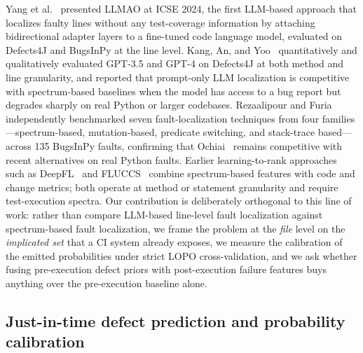 \documentclass[preprint,12pt]{elsarticle}
\begin{document}
Yang et al.~\cite{yang2024llmao} presented LLMAO at ICSE 2024, the first LLM-based approach that localizes faulty lines without any test-coverage information by attaching bidirectional adapter layers to a fine-tuned code language model, evaluated on Defects4J and BugsInPy at the line level. Kang, An, and Yoo~\cite{kang2024llmfl} quantitatively and qualitatively evaluated GPT-3.5 and GPT-4 on Defects4J at both method and line granularity, and reported that prompt-only LLM localization is competitive with spectrum-based baselines when the model has access to a bug report but degrades sharply on real Python or larger codebases. Rezaalipour and Furia~\cite{rezaalipour2024pyfl} independently benchmarked seven fault-localization techniques from four families---spectrum-based, mutation-based, predicate switching, and stack-trace based---across 135 BugsInPy faults, confirming that Ochiai~\cite{abreu2009spectrum} remains competitive with recent alternatives on real Python faults. Earlier learning-to-rank approaches such as DeepFL~\cite{li2019deepfl} and FLUCCS~\cite{sohn2017fluccs} combine spectrum-based features with code and change metrics; both operate at method or statement granularity and require test-execution spectra. Our contribution is deliberately orthogonal to this line of work: rather than compare LLM-based line-level fault localization against spectrum-based fault localization, we frame the problem at the \emph{file} level on the \emph{implicated set} that a CI system already exposes, we measure the calibration of the emitted probabilities under strict LOPO cross-validation, and we ask whether fusing pre-execution defect priors with post-execution failure features buys anything over the pre-execution baseline alone.

\subsection{Just-in-time defect prediction and probability calibration}
\end{document}
